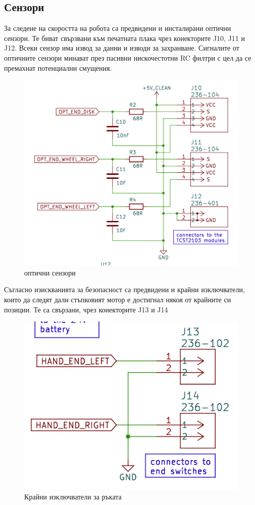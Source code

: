 \subsection{Сензори}

За следене на скоростта на робота са предвидени и инсталирани оптични сензори. Те биват свързвани към печатната плака чрез конекторите J10, J11 и J12. Всеки сензор има извод за данни и изводи за захранване. Сигналите от оптичните сензори минават през пасивни нискочестотни RC филтри с цел да се премахнат потенциални смущения.

\begin{figure}[H]
    \centering
    \includegraphics[width=0.6\linewidth]{images/optical-sensors.png}
    
    \caption{оптични сензори}
    \label{fig:optical-sensors} 
\end{figure}

Съгласно изискванията за безопасност са предвидени и крайни изключватели, които да следят дали стъпковият мотор е достигнал някоя от крайните си позиции. Те са свързани, чрез конекторите J13 и J14

\begin{figure}[H]
    \centering
    \includegraphics[width=0.6\linewidth]{images/hand-endswitches.png}
    
    \caption{Крайни изключватели за ръката}
    \label{fig:hand-endswitches} 
\end{figure}



